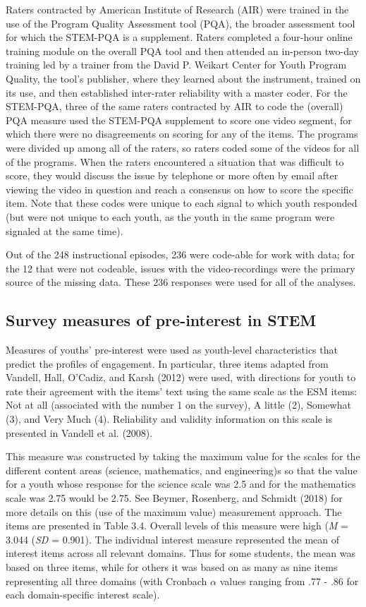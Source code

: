 \documentclass[]{msu-thesis}
\theoremstyle{definition}
\theoremstyle{definition}
\theoremstyle{definition}
\theoremstyle{remark}
\begin{document}
Raters contracted by American Institute of Research (AIR) were trained
in the use of the Program Quality Assessment tool (PQA), the broader
assessment tool for which the STEM-PQA is a supplement. Raters completed
a four-hour online training module on the overall PQA tool and then
attended an in-person two-day training led by a trainer from the David
P. Weikart Center for Youth Program Quality, the tool's publisher, where
they learned about the instrument, trained on its use, and then
established inter-rater reliability with a master coder. For the
STEM-PQA, three of the same raters contracted by AIR to code the
(overall) PQA measure used the STEM-PQA supplement to score one video
segment, for which there were no disagreements on scoring for any of the
items. The programs were divided up among all of the raters, so raters
coded some of the videos for all of the programs. When the raters
encountered a situation that was difficult to score, they would discuss
the issue by telephone or more often by email after viewing the video in
question and reach a consensus on how to score the specific item. Note
that these codes were unique to each signal to which youth responded
(but were not unique to each youth, as the youth in the same program
were signaled at the same time).

Out of the 248 instructional episodes, 236 were code-able for work with
data; for the 12 that were not codeable, issues with the
video-recordings were the primary source of the missing data. These 236
responses were used for all of the analyses.

\subsection{Survey measures of pre-interest in
STEM}\label{survey-measures-of-pre-interest-in-stem}

Measures of youths' pre-interest were used as youth-level
characteristics that predict the profiles of engagement. In particular,
three items adapted from Vandell, Hall, O'Cadiz, and Karsh (2012) were
used, with directions for youth to rate their agreement with the items'
text using the same scale as the ESM items: Not at all (associated with
the number 1 on the survey), A little (2), Somewhat (3), and Very Much
(4). Reliability and validity information on this scale is presented in
Vandell et al. (2008).

This measure was constructed by taking the maximum value for the scales
for the different content areas (science, mathematics, and engineering)s
so that the value for a youth whose response for the science scale was
2.5 and for the mathematics scale was 2.75 would be 2.75. See Beymer,
Rosenberg, and Schmidt (2018) for more details on this (use of the
maximum value) measurement approach. The items are presented in Table
3.4. Overall levels of this measure were high (\emph{M} = 3.044
(\emph{SD} = 0.901). The individual interest measure represented the
mean of interest items across all relevant domains. Thus for some
students, the mean was based on three items, while for others it was
based on as many as nine items representing all three domains (with
Cronbach \(\alpha\) values ranging from .77 - .86 for each
domain-specific interest scale).
\end{document}
